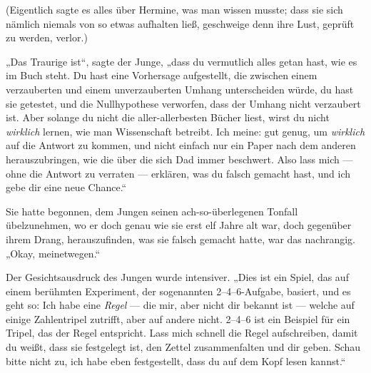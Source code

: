 (Eigentlich sagte es alles über Hermine, was man wissen musste; dass sie sich nämlich niemals von so etwas aufhalten ließ, geschweige denn ihre Lust, geprüft zu werden, verlor.)

„Das Traurige ist“, sagte der Junge, „dass du vermutlich alles getan hast, wie es im Buch steht. Du hast eine Vorhersage aufgestellt, die zwischen einem verzauberten und einem unverzauberten Umhang unterscheiden würde, du hast sie getestet, und die Nullhypothese verworfen, dass der Umhang nicht verzaubert ist. Aber solange du nicht die aller-allerbesten Bücher liest, wirst du nicht \emph{wirklich} lernen, wie man Wissenschaft betreibt. Ich meine: gut genug, um \emph{wirklich} auf die Antwort zu kommen, und nicht einfach nur ein Paper nach dem anderen herauszubringen, wie die über die sich Dad immer beschwert. Also lass mich — ohne die Antwort zu verraten — erklären, was du falsch gemacht hast, und ich gebe dir eine neue Chance.“

Sie hatte begonnen, dem Jungen seinen ach-so-überlegenen Tonfall übelzunehmen, wo er doch genau wie sie erst elf Jahre alt war, doch gegenüber ihrem Drang, herauszufinden, was sie falsch gemacht hatte, war das nachrangig.
„Okay, meinetwegen.“

Der Gesichtsausdruck des Jungen wurde intensiver.
„Dies ist ein Spiel, das auf einem berühmten Experiment, der sogenannten 2–4–6-Aufgabe, basiert, und es geht so: Ich habe eine \emph{Regel} — die mir, aber nicht dir bekannt ist — welche auf einige Zahlentripel zutrifft, aber auf andere nicht. 2–4–6 ist ein Beispiel für ein Tripel, das der Regel entspricht. Lass mich schnell die Regel aufschreiben, damit du weißt, dass sie festgelegt ist, den Zettel zusammenfalten und dir geben. Schau bitte nicht zu, ich habe eben festgestellt, dass du auf dem Kopf lesen kannst.“

